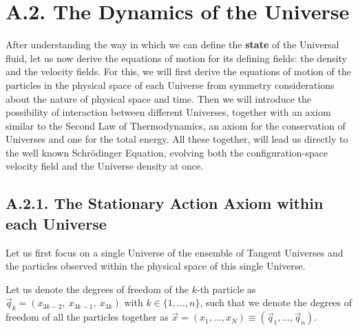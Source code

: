 \documentclass[11pt, a4paper]{article} %
\begin{document}
\newpage
{}
\section*{A.2. The Dynamics of the Universe}

After understanding the way in which we can define the {\bf state} of the Universal fluid, let us now derive the equations of motion for its defining fields: the density and the velocity fields. For this, we will first derive the equations of motion of the particles in the physical space of each Universe from symmetry considerations about the nature of physical space and time. Then we will introduce the possibility of interaction between different Universes, together with an axiom similar to the Second Law of Thermodynamics, an axiom for the conservation of Universes and one for the total energy. All these together, will lead us directly to the well known Schrödinger Equation, evolving both the configuration-space velocity field and the Universe density at once.

\subsection*{A.2.1. The Stationary Action Axiom within each Universe}


Let us first focus on a single Universe of the ensemble of Tangent Universes and the particles observed within the physical space of this single Universe.

Let us denote the degrees of freedom of the $k$-th particle as $\vec{q}_k=(x_{3k-2},\ x_{3k-1},\ x_{3k} )$ with $k\in\{1,...,n\}$, such that we denote the degrees of freedom of all the particles together as $\vec{x}=(x_1,...,x_N)\equiv (\vec{q}_{1},...,\vec{q}_n)$.
\end{document}
